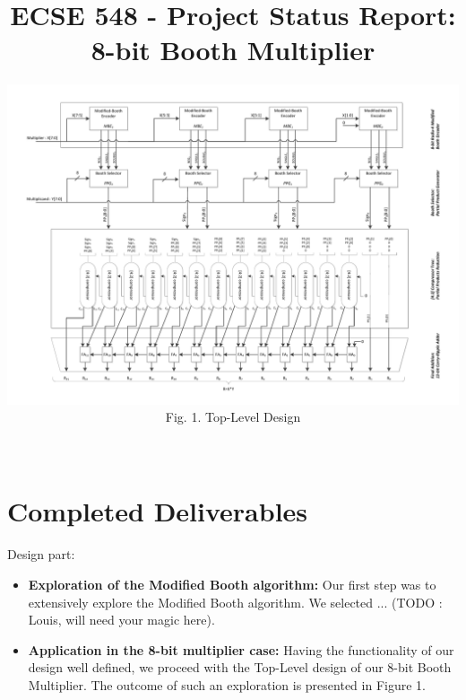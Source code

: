 \documentclass[conference]{IEEEtran}
\begin{document}
\title{ECSE 548 - Project Status Report:\\ 8-bit Booth Multiplier}
\author{

\includegraphics[height=0.35\textheight, width=0.7\linewidth]{BoothTopLevel.pdf}
\\Fig. 1. Top-Level Design\\~\\
}

\maketitle
\IEEEpeerreviewmaketitle



\section{Completed Deliverables}
Design part:
\begin{itemize}
\item \textbf{Exploration of the Modified Booth algorithm:}
Our first step was to extensively 
explore the Modified Booth algorithm.
We selected ...
(TODO :  Louis, will need your magic here).

\item \textbf{Application in the 8-bit multiplier case:}
Having the functionality of our design 
well defined, we proceed with the Top-Level design 
of our 8-bit Booth Multiplier.
The outcome of such an exploration is presented
in Figure 1.

\end{itemize}
\end{document}
